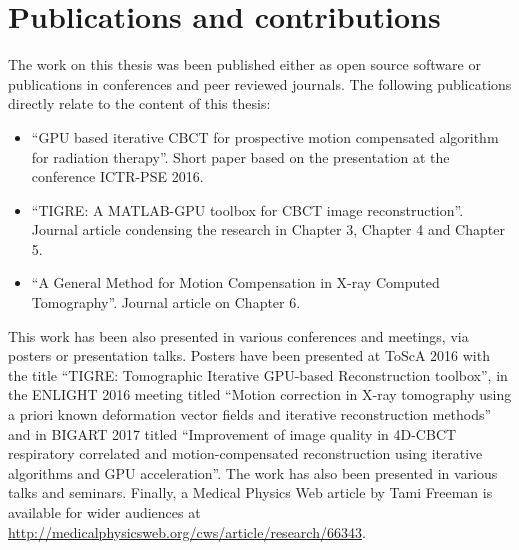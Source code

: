\FloatBarrier


\section{Publications and contributions}

The work on this thesis was been published either as open source software or publications in conferences and peer reviewed journals. The following publications directly relate to the content of this thesis:

\begin{itemize}
\item ``GPU based iterative CBCT for prospective motion compensated algorithm for radiation therapy''\cite{biguri2016gpu}. Short paper based on the presentation at the conference ICTR-PSE 2016. 
\item ``TIGRE: A MATLAB-GPU toolbox for CBCT image reconstruction''\cite{TIGRE}. Journal article condensing the research in Chapter 3, Chapter 4 and Chapter 5. 
\item  ``A General Method for Motion Compensation in X-ray Computed Tomography''\cite{biguri2017general}. Journal article on Chapter 6. 
\end{itemize}

This work has been also presented in various conferences and meetings, via posters or presentation talks. Posters have been presented at ToScA 2016 with the title ``TIGRE: Tomographic Iterative GPU-based Reconstruction toolbox''\cite{biguri_ander_2016_159016}, in the ENLIGHT 2016 meeting titled ``Motion correction in X-ray tomography using a priori known deformation vector fields and iterative reconstruction methods''\cite{biguri2016motion} and in BIGART 2017 titled ``Improvement of image quality in 4D-CBCT respiratory correlated and motion-compensated reconstruction using iterative algorithms and GPU acceleration''\cite{biguri2017motion}. The work has also been presented in various talks and seminars. Finally, a Medical Physics Web article by Tami Freeman is available for wider audiences at \href{http://medicalphysicsweb.org/cws/article/research/66343}{http://medicalphysicsweb.org/cws/article/research/66343}.


